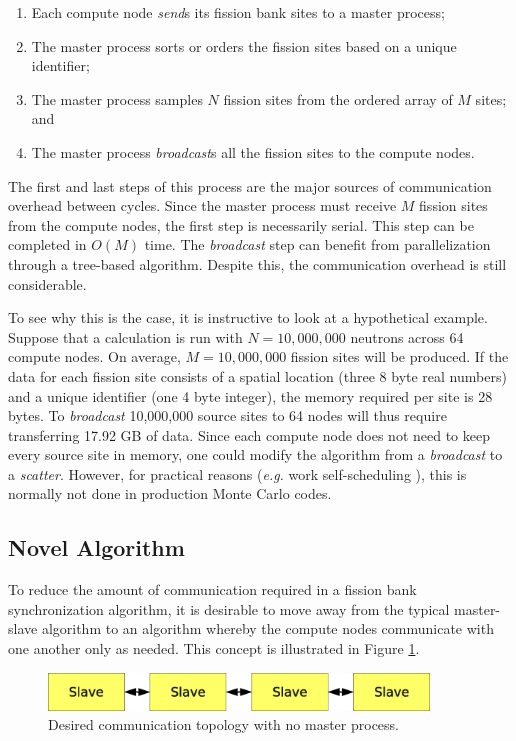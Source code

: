 \begin{enumerate}
\item Each compute node \emph{send}s its fission bank sites to a
  master process;
\item The master process sorts or orders \cite{brown-sort} the fission
  sites based on a unique identifier;
\item The master process samples $N$ fission sites from the ordered
  array of $M$ sites; and
\item The master process \emph{broadcast}s all the fission sites to
  the compute nodes.
\end{enumerate}

The first and last steps of this process are the major sources of
communication overhead between cycles. Since the master process must
receive $M$ fission sites from the compute nodes, the first step is
necessarily serial. This step can be completed in $O(M)$ time. The
\emph{broadcast} step can benefit from parallelization through a
tree-based algorithm. Despite this, the communication overhead is
still considerable.

To see why this is the case, it is instructive to look at a
hypothetical example. Suppose that a calculation is run with $N =
10,000,000$ neutrons across 64 compute nodes. On average, $M =
10,000,000$ fission sites will be produced. If the data for each
fission site consists of a spatial location (three 8 byte real
numbers) and a unique identifier (one 4 byte integer), the memory
required per site is 28 bytes. To \emph{broadcast} 10,000,000 source
sites to 64 nodes will thus require transferring 17.92 GB of data.
Since each compute node does not need to keep every source site in
memory, one could modify the algorithm from a \emph{broadcast} to a
\emph{scatter}. However, for practical reasons ({\em e.g.} work
self-scheduling \cite{brown-lectures}), this is normally not done in
production Monte Carlo codes.

\subsection{Novel Algorithm}
\label{sec:algorithm}

To reduce the amount of communication required in a fission bank
synchronization algorithm, it is desirable to move away from the
typical master-slave algorithm to an algorithm whereby the compute
nodes communicate with one another only as needed. This concept is
illustrated in Figure \ref{fig:slave-only}.
\begin{figure}[h!]
  \centering
  \includegraphics[width=0.9\textwidth]{figures/master-slave/slave-only.eps}
  \caption{Desired communication topology with no master process.}
  \label{fig:slave-only}
\end{figure}

